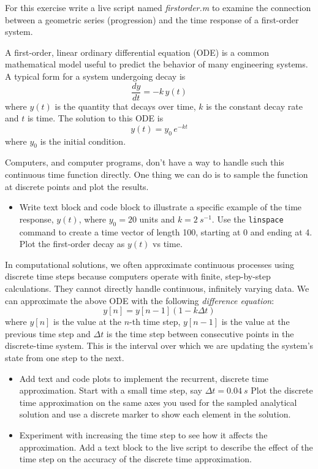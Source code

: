 \documentclass[../../book.tex]{subfiles}
\begin{document}
\begin{ex}

For this exercise write a live script named \emph{firstorder.m} to examine the connection between a geometric series (progression) and the time response of a first-order system.

A first-order, linear ordinary differential equation (ODE) is a common mathematical model useful to predict the behavior of many engineering systems.  A typical form for a system undergoing decay is
\begin{equation*}
     \frac{dy}{dt} = -k \, y(t)
\end{equation*}
where $y(t)$ is the quantity that decays over time, $k$ is the constant decay rate and $t$ is time.  The solution to this ODE is
\begin{equation*}
     y(t) = y_0 \, e^{-kt}
\end{equation*}
where $y_0$ is the initial condition.

Computers, and computer programs, don't have a way to handle such this continuous time function directly.  One thing we can do is to sample the function at discrete points and plot the results.

\begin{itemize}
     \item Write text block and code block to illustrate a specific example of the time response, $y(t)$, where $y_0 = 20$ units and $k=\SI{2}{s^{-1}}$.  Use the \lstinline{linspace} command to create a time vector of length 100, starting at 0 and ending at 4. Plot the first-order decay as $y(t)$ vs time.
\end{itemize}

In computational solutions, we often approximate continuous processes using discrete time steps because computers operate with finite, step-by-step calculations. They cannot directly handle continuous, infinitely varying data.  We can approximate the above ODE with the following \emph{difference equation}:
\begin{equation*}
     y[n] = y[n-1] (1- k \Delta t)
\end{equation*}
where $y[n]$ is the value at the $n$-th time step, $y[n-1]$ is the value at the previous time step and $\Delta t$ is the time step between consecutive points in the discrete-time system. This is the interval over which we are updating the system's state from one step to the next.

\begin{itemize}
     \item Add text and code plots to implement the recurrent, discrete time approximation.  Start with a small time step, say $\Delta t = \SI{0.04}{s}$ Plot the discrete time approximation on the same axes you used for the sampled analytical solution and use a discrete marker to show each element in the solution.
     \item Experiment with increasing the time step to see how it affects the approximation.  Add a text block to the live script to describe the effect of the time step on the accuracy of the discrete time approximation.
\end{itemize}

\end{ex}
\end{document}
